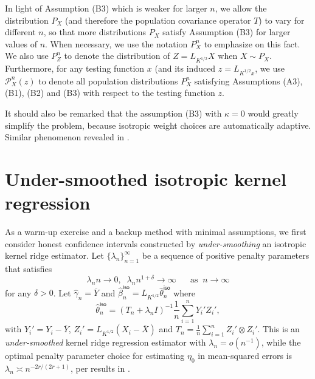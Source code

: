 \documentclass[11pt,a4paper]{article}
\renewcommand{\hat}{\widehat}
\renewcommand{\bar}{\overline}
\theoremstyle{definition}
\theoremstyle{plain}
\theoremstyle{remark}
\newcommand{\iso}{\mathsf{iso}}
\begin{document}
%
%

{In light of Assumption (B3) which is weaker for larger $n$, we allow the distribution $P_X$ (and therefore the population covariance operator $T$) to vary for different $n$,
so that more distributions $P_X$ satisfy Assumption (B3) for larger values of $n$.
When necessary, we use the notation $P_X^n$ to emphasize on this fact.
We also use $P_Z^n$ to denote the distribution of $Z=L_{K^{1/2}}X$ when $X\sim P_X$.
Furthermore, for any testing function $x$ (and its induced $z=L_{K^{1/2}x}$, we use $\mathcal P_X^n(z)$ to denote all population distributions $P_X^n$ satisfying Assumptions (A3), (B1), (B2) and (B3) with respect to the testing function $z$.}

{\color{red}It should also be remarked that the assumption (B3) with $\kappa=0$ would greatly simplify the problem, because isotropic weight choices are automatically adaptive.
Similar phenomenon revealed in \citep{liu2025scalable}.}

\section{Under-smoothed isotropic kernel regression}\label{sec:isotropic}

As a warm-up exercise and a backup method with minimal assumptions, we first consider honest confidence intervals constructed by \emph{under-smoothing} an isotropic kernel ridge estimator.
Let $\{\lambda_n\}_{n=1}^{\infty}$ be a sequence of positive penalty parameters that satisfies
\begin{equation}
\lambda_n n \to 0,\;\; \lambda_n n^{1+\delta}\to \infty\;\;\;\;\;\;\text{as}\;\;n\to\infty
\label{eq:lambdan-1}
\end{equation}
for any $\delta>0$.
Let $\hat\gamma_n = \bar Y$ and $\hat\beta_n^\iso=L_{K^{1/2}}\hat\theta_n^\iso$ where 
$$
\hat\theta_n^\iso = (T_n+\lambda_n I)^{-1}\frac{1}{n}\sum_{i=1}^n Y_i'Z_i',
$$
with $Y_i'=Y_i-\bar Y$, $Z_i'=L_{K^{1/2}}(X_i-\bar X)$ and $T_n=\frac{1}{n}\sum_{i=1}^n Z_i'\otimes Z_i'$.
This is an \emph{under-smoothed} kernel ridge regression estimator with $\lambda_n=o(n^{-1})$, while the optimal penalty parameter choice for estimating $\eta_0$ in mean-squared errors 
is $\lambda_n\asymp n^{-2r/(2r+1)}$, per results in \cite{cai2012minimax}.
\end{document}
